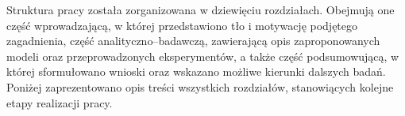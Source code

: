 Struktura pracy została zorganizowana w dziewięciu rozdziałach. Obejmują one część wprowadzającą, w której przedstawiono tło i motywację podjętego zagadnienia, część analityczno–badawczą, zawierającą opis zaproponowanych modeli oraz przeprowadzonych eksperymentów, a także część podsumowującą, w której sformułowano wnioski oraz wskazano możliwe kierunki dalszych badań. Poniżej zaprezentowano opis treści wszystkich rozdziałów, stanowiących kolejne etapy realizacji pracy.
\\
